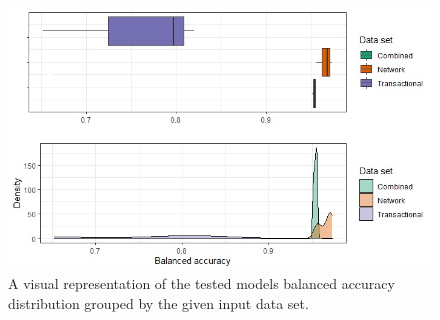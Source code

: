 \begin{figure}
	\begin{center}
		\includegraphics[scale = 0.6]{fig/CH3/data_sets_balance_acc_density_LI.jpg}
		\caption{A visual representation of the tested models balanced accuracy distribution grouped by the given input data set.}
		\label{fig:ch3_final_results_balanced_acc_density}
	\end{center}	
\end{figure}



